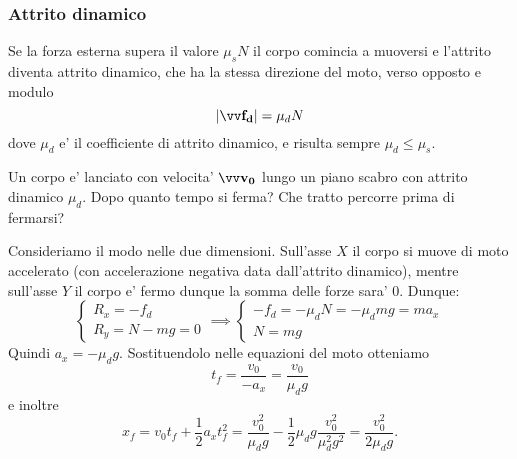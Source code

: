 \subsubsection{Attrito dinamico}

Se la forza esterna supera il valore $\mu_s N$ il corpo comincia a muoversi e l'attrito diventa attrito dinamico, che ha la stessa direzione del moto, verso opposto e modulo \[
    \vmag{f_d} = \mu_d N    
\]
dove $\mu_d$ e' il coefficiente di attrito dinamico, e risulta sempre $\mu_d \leq \mu_s$.

\begin{example}
    Un corpo e' lanciato con velocita' $\bvv{v_0}$ lungo un piano scabro con attrito dinamico $\mu_d$. Dopo quanto tempo si ferma? Che tratto percorre prima di fermarsi?

    Consideriamo il modo nelle due dimensioni. Sull'asse $X$ il corpo si muove di moto accelerato (con accelerazione negativa data dall'attrito dinamico), mentre sull'asse $Y$ il corpo e' fermo dunque la somma delle forze sara' $0$. Dunque:
    \begin{equation*}
        \begin{cases}
            R_x = -f_d \\
            R_y = N - mg = 0            
        \end{cases}
        \implies \begin{cases}
            -f_d = -\mu_d N = -\mu_d mg = ma_x\\
            N = mg
        \end{cases} 
    \end{equation*}
    Quindi $a_x = -\mu_d g$. Sostituendolo nelle equazioni del moto otteniamo\[
        t_f = \frac{v_0}{-a_x} = \frac{v_0}{\mu_d g}
    \] e inoltre \[
        x_f = v_0t_f + \frac{1}{2}a_xt_f^2 = \frac{v_0^2}{\mu_d g} - \frac{1}{2}\mu_d g\frac{v_0^2}{\mu_d^2g^2} = \frac{v_0^2}{2\mu_d g}.
    \]
\end{example}


